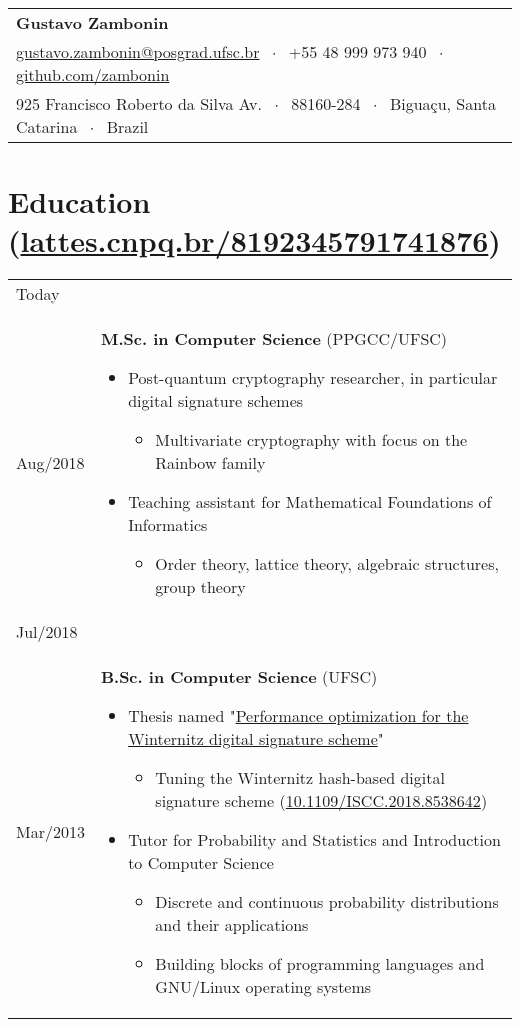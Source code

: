 \documentclass{article}
\newenvironment{contenttable}[1]
  {\section*{#1}
   \newcolumntype{L}{>{\bf \raggedleft}p{0.1\textwidth}}
   \newcolumntype{R}{p{0.82\textwidth}}
   \begin{tabular}{L!{\color{lightgray} \vrule}R}}
  {\end{tabular}}
\newcommand{\csep}{$\;\cdot\;$}
\newcommand{\lattesurl}{lattes.cnpq.br/8192345791741876}
\newcommand{\bscurl}{https://repositorio.ufsc.br/handle/123456789/187875}
\newcommand{\doi}{10.1109/ISCC.2018.8538642}
\begin{document}
\begin{tabular}{@{\hspace{0mm}}l}
  {\Large \textbf{Gustavo Zambonin}} \\
  \href{mailto:gustavo.zambonin@posgrad.ufsc.br}{gustavo.zambonin@posgrad.ufsc.br}
      \csep{} +55 48 999 973 940
      \csep{} \href{https://github.com/zambonin}{github.com/zambonin} \\
  925 Francisco Roberto da Silva Av. \csep{} 88160-284
      \csep{} Biguaçu, Santa Catarina \csep{} Brazil
\end{tabular}
\hfill {}

\begin{contenttable}{Education
    {\normalsize\normalfont (\href{http://\lattesurl}{\lattesurl})}}
  Today \\ Aug/2018 & \textbf{M.Sc. in Computer Science} (PPGCC/UFSC)
  \begin{itemize}
    \item Post-quantum cryptography researcher, in particular digital signature
        schemes
    \begin{itemize}
      \item Multivariate cryptography with focus on the Rainbow family
    \end{itemize}
    \item Teaching assistant for Mathematical Foundations of Informatics
    \begin{itemize}
      \item Order theory, lattice theory, algebraic structures, group theory
    \end{itemize}
  \end{itemize} \\

  Jul/2018 \\ Mar/2013 & \textbf{B.Sc. in Computer Science} (UFSC)
  \begin{itemize}
    \item Thesis named "\href{\bscurl}{Performance optimization for the
        Winternitz digital signature scheme}"
    \begin{itemize}
      \item Tuning the Winternitz hash-based digital signature scheme
          (\href{https://doi.org/\doi}{\doi})
    \end{itemize}
    \item Tutor for Probability and Statistics and Introduction to Computer
        Science
    \begin{itemize}
      \item Discrete and continuous probability distributions and their
          applications
      \item Building blocks of programming languages and GNU/Linux operating
          systems
    \end{itemize}
    \vspace{-5mm}
  \end{itemize}
\end{contenttable}
\end{document}

